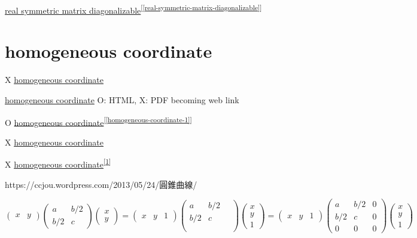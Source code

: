 \documentclass[
]{book}
\theoremstyle{definition}
\theoremstyle{definition}
\theoremstyle{definition}
\theoremstyle{definition}
\theoremstyle{remark}
\begin{document}
\protect\hyperlink{real-symmetric-matrix-diagonalizable}{real symmetric matrix diagonalizable}\textsuperscript{{[}\ref{real-symmetric-matrix-diagonalizable}{]}}

\hypertarget{homogeneous-coordinate}{%
\section{homogeneous coordinate}\label{homogeneous-coordinate}}

X \href{homogeneous-coordinate-1}{homogeneous coordinate}

\href{homogeneous-coordinate-1.html}{homogeneous coordinate} O: HTML, X: PDF becoming web link

O \protect\hyperlink{homogeneous-coordinate-1}{homogeneous coordinate}\textsuperscript{{[}\ref{homogeneous-coordinate-1}{]}}

X \protect\hyperlink{homogeneous-coordinate}{homogeneous coordinate}

X \protect\hyperlink{homogeneous-coordinate}{homogeneous coordinate}\textsuperscript{{[}\ref{homogeneous-coordinate}{]}}

\begin{CJK}{UTF8}{bsmi}
https://ccjou.wordpress.com/2013/05/24/圓錐曲線/
\end{CJK}

\[
\begin{pmatrix}x & y\end{pmatrix}\begin{pmatrix}a & b/2\\
b/2 & c
\end{pmatrix}\begin{pmatrix}x\\
y
\end{pmatrix}=\begin{pmatrix}x & y & 1\end{pmatrix}\begin{pmatrix}a & b/2 & ~\\
b/2 & c\\
\\
\end{pmatrix}\begin{pmatrix}x\\
y\\
1
\end{pmatrix}=\begin{pmatrix}x & y & 1\end{pmatrix}\begin{pmatrix}a & b/2 & 0\\
b/2 & c & 0\\
0 & 0 & 0
\end{pmatrix}\begin{pmatrix}x\\
y\\
1
\end{pmatrix}
\]
\end{document}
